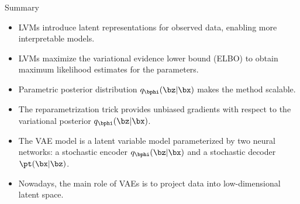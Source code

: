 \documentclass{beamer}
\begin{document}
\begin{frame}{Summary}
	\begin{itemize}
		\item LVMs introduce latent representations for observed data, enabling more interpretable models.
		\vfill
		\item LVMs maximize the variational evidence lower bound (ELBO) to obtain maximum likelihood estimates for the parameters.
		\vfill
		\item Parametric posterior distribution $q_{\bphi}(\bz| \bx)$ makes the method scalable.
		\vfill
		\item The reparametrization trick provides unbiased gradients with respect to the variational posterior $q_{\bphi}(\bz| \bx)$.
		\vfill
		\item The VAE model is a latent variable model parameterized by two neural networks: a stochastic encoder $q_{\bphi}(\bz| \bx)$ and a stochastic decoder $\pt(\bx | \bz)$.
		\vfill
		\item Nowadays, the main role of VAEs is to project data into low-dimensional latent space.
	\end{itemize}
\end{frame}
\end{document}
